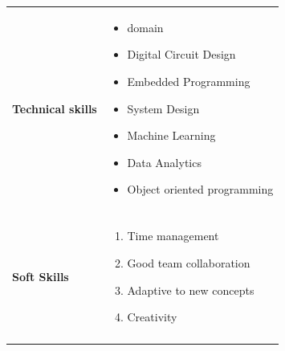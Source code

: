 \documentclass[a4paper,11pt,oneside]{article}
\begin{document}
\newpage
\noindent \begin{tabular}{@{} p{} p{\textwidth}}
 \textbf{\large{Technical skills }}
    & \vspace{-2em}
      \begin{itemize}
        \setlength\itemsep{0.1em}
        \item domain
        \item Digital Circuit Design
        \item Embedded Programming
        \item System Design
        \item Machine Learning
        \item Data Analytics
        \item Object oriented programming
    \end{itemize}\\ \\
    
 \textbf{\large{Soft Skills}}
    & \vspace{-2em}
      \begin{enumerate}
        \setlength\itemsep{0.1em}
        \item Time management
        \item Good team collaboration
        \item Adaptive to new concepts
        \item Creativity
      \end{enumerate} \\ \\
 

\end{tabular}
\end{document}
